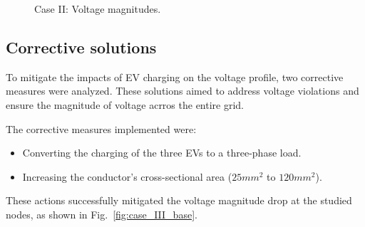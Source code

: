 \documentclass[12pt, 3p]{elsarticle}
\begin{document}
\begin{figure}[!ht]
    \centering
    \caption{Case II: Voltage magnitudes.}
    \label{fig:case_II_base}
\end{figure}

\subsection{Corrective solutions}

To mitigate the impacts of EV charging on 
the voltage profile, 
two corrective measures were analyzed. These solutions aimed 
to address voltage violations and ensure the magnitude of voltage 
acrros the entire grid.

The corrective measures implemented were:  

\begin{itemize}
    \item Converting the charging of the three EVs to a three-phase load. 
    \item Increasing the conductor's cross-sectional area 
    ($25 mm^{2}$ to $120 mm^{2}$). 
\end{itemize}
 
These actions successfully mitigated the voltage magnitude drop 
at the studied nodes, as shown in Fig.~\ref{fig:case_III_base}.
\end{document}
